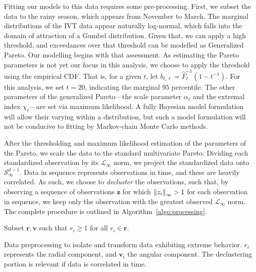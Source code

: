 Fitting our models to this data requires some pre-processing. First, we subset the data to the rainy
  season, which appears from November to March.  The marginal distributions of the
  IVT data appear naturally log-normal, which falls into the domain of attraction of a Gumbel
  distribution.  Given that, we can apply a high threshold, and exceedances over that threshold can
  be modelled as Generalized Pareto.  Our modelling begins with that assessment.  As estimating
  the Pareto parameters is not yet our focus in this analysis, we choose to apply the threshold
  using the empirical CDF.  That is, for a given $t$, let $b_{t,\ell} = \hat{F}_{\ell}^{-1}(1 - t^{-1})$.  For
  this analysis, we set $t = 20$, indicating the marginal $95$ percentile.  The other parameters of the
  generalized Pareto---the scale parameter $\alpha_{\ell}$ and the extremal index $\chi_{\ell}$---are set via
  maximum likelihood.  A fully Bayesian model formulation will allow their varying within a
  distribution, but such a model formulation will not be conducive to fitting by Markov-chain Monte
  Carlo methods.

After the thresholding and maximum likelihood estimation of the parameters of the Pareto, we scale
  the data to the standard multivariate Pareto.  Dividing each standardized observation by its
  $\mathcal{L}_{\infty}$ norm, we project the standardized data onto $\mathcal{S}_{\infty}^{d-1}$.
  Data in sequence represents observations in time, and these are heavily correlated.  As such, we
  choose to \emph{decluster} the observations, such that, by observing a sequence of observations
  $\bm{ z}$ for which $\inorm{z_i} > 1$ for each observation in sequence, we keep only the observation
  with the greatest observed $\mathcal{L}_{\infty}$ norm.  The complete procedure is outlined in
  Algorithm~\ref{algo:processing}.

\begin{algorithm}
  Subset $\bm{ r},\bm{ v}$ such that $r_i \geq 1$ for all $r_i\in \bm{r}$.\\
 \caption{Data preprocessing to isolate and transform data exhibiting extreme behavior.  $r_i$
   represents the radial component, and $\bm{v}_i$ the angular component.  The declustering
   portion is relevant if data is correlated in time.\label{algo:processing}}
\end{algorithm}

